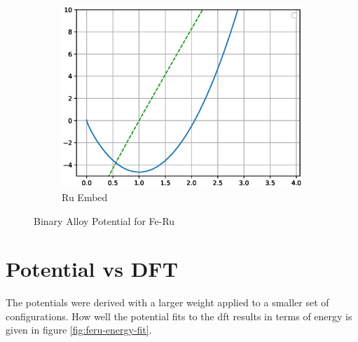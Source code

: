 \begin{figure}[htb]
\begin{subfigure}{.32\textwidth}
  \includegraphics[width=.94\linewidth]{chapters/potentials_fe_pd_ru/feru_potential/function_plots/ru_embe.eps}  
  \caption{Ru Embed}
  \label{fig:feru-ru-embe}
\end{subfigure}
\caption{Binary Alloy Potential for Fe-Ru}
\label{fig:feru-fcc-function-plots}
\end{figure}









\clearpage
\section{Potential vs DFT}

The potentials were derived with a larger weight applied to a smaller set of configurations.  How well the potential fits to the \acrshort{dft} results in terms of energy is given in figure \ref{fig:feru-energy-fit}.

